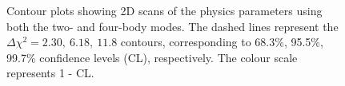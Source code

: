 \begin{figure}[h]
\centering
{}
\caption{Contour plots showing 2D scans of the physics parameters using both the two- and four-body modes. The dashed lines represent the $\Delta \chi^2 = 2.30,\ 6.18,\ 11.8$ contours, corresponding to 68.3\%, 95.5\%, 99.7\% confidence levels (CL), respectively. The colour scale represents 1 - CL.}
\label{gammadiniplotsallmodes}
\end{figure}


